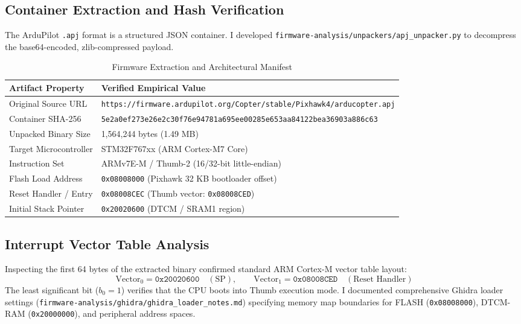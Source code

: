 \documentclass[11pt,a4paper]{article}
\begin{document}
\subsection{Container Extraction and Hash Verification}
The ArduPilot \texttt{.apj} format is a structured JSON container. I developed \texttt{firmware-analysis/unpackers/apj\_unpacker.py} to decompress the base64-encoded, zlib-compressed payload.
\begin{table}[htbp]
    \centering
    \small
    \begin{tabular}{ll}
        \toprule
        \textbf{Artifact Property} & \textbf{Verified Empirical Value} \\
        \midrule
        Original Source URL & \texttt{https://firmware.ardupilot.org/Copter/stable/Pixhawk4/arducopter.apj} \\
        Container SHA-256 & \texttt{5e2a0ef273e26e2c30f76e94781a695ee00285e653aa84122bea36903a886c63} \\
        Unpacked Binary Size & 1,564,244 bytes (1.49 MB) \\
        Target Microcontroller & STM32F767xx (ARM Cortex-M7 Core) \\
        Instruction Set & ARMv7E-M / Thumb-2 (16/32-bit little-endian) \\
        Flash Load Address & \texttt{0x08008000} (Pixhawk 32 KB bootloader offset) \\
        Reset Handler / Entry & \texttt{0x08008CEC} (Thumb vector: \texttt{0x08008CED}) \\
        Initial Stack Pointer & \texttt{0x20020600} (DTCM / SRAM1 region) \\
        \bottomrule
    \end{tabular}
    \caption{Firmware Extraction and Architectural Manifest}
    \label{tab:firmware}
\end{table}

\subsection{Interrupt Vector Table Analysis}
Inspecting the first 64 bytes of the extracted binary confirmed standard ARM Cortex-M vector table layout:
\begin{equation}
    \text{Vector}_0 = \texttt{0x20020600} \quad (\text{SP}), \qquad \text{Vector}_1 = \texttt{0x08008CED} \quad (\text{Reset Handler})
\end{equation}
The least significant bit ($b_0 = 1$) verifies that the CPU boots into Thumb execution mode. I documented comprehensive Ghidra loader settings (\texttt{firmware-analysis/ghidra/ghidra\_loader\_notes.md}) specifying memory map boundaries for FLASH (\texttt{0x08008000}), DTCM-RAM (\texttt{0x20000000}), and peripheral address spaces.
\end{document}
